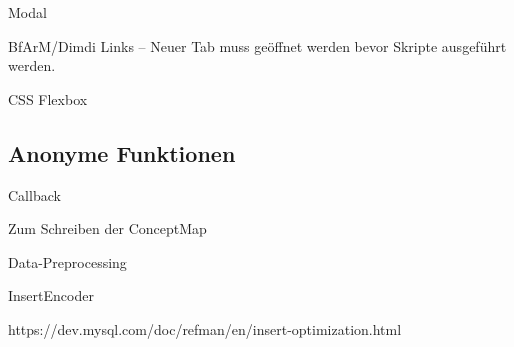 Modal

BfArM/Dimdi Links -- Neuer Tab muss geöffnet werden bevor Skripte ausgeführt werden. \label{externe-kode-links}

CSS Flexbox \cite{flexbox-csstricks}

\subsection{Anonyme Funktionen}

Callback

Zum Schreiben der ConceptMap

Data-Preprocessing

InsertEncoder

https://dev.mysql.com/doc/refman/en/insert-optimization.html
